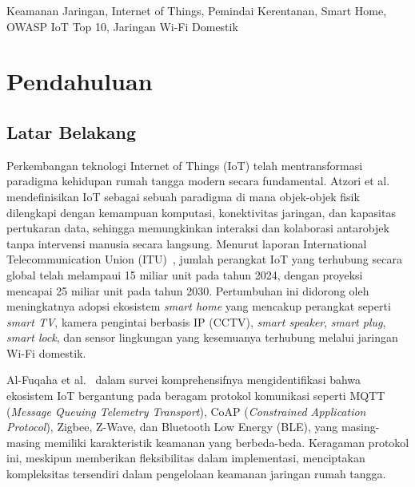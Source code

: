 \documentclass[conference]{IEEEtran}
\begin{document}
\begin{IEEEkeywords}
Keamanan Jaringan, Internet of Things, Pemindai Kerentanan, Smart Home, OWASP IoT Top 10, Jaringan Wi-Fi Domestik
\end{IEEEkeywords}

\section{Pendahuluan}

\subsection{Latar Belakang}

Perkembangan teknologi Internet of Things (IoT) telah mentransformasi paradigma kehidupan rumah tangga modern secara fundamental. Atzori et al.\ \cite{atzori2010} mendefinisikan IoT sebagai sebuah paradigma di mana objek-objek fisik dilengkapi dengan kemampuan komputasi, konektivitas jaringan, dan kapasitas pertukaran data, sehingga memungkinkan interaksi dan kolaborasi antarobjek tanpa intervensi manusia secara langsung. Menurut laporan International Telecommunication Union (ITU)\ \cite{itu2024}, jumlah perangkat IoT yang terhubung secara global telah melampaui 15 miliar unit pada tahun 2024, dengan proyeksi mencapai 25 miliar unit pada tahun 2030. Pertumbuhan ini didorong oleh meningkatnya adopsi ekosistem \textit{smart home} yang mencakup perangkat seperti \textit{smart TV}, kamera pengintai berbasis IP (CCTV), \textit{smart speaker}, \textit{smart plug}, \textit{smart lock}, dan sensor lingkungan yang kesemuanya terhubung melalui jaringan Wi-Fi domestik.

Al-Fuqaha et al.\ \cite{alfuqaha2015} dalam survei komprehensifnya mengidentifikasi bahwa ekosistem IoT bergantung pada beragam protokol komunikasi seperti MQTT (\textit{Message Queuing Telemetry Transport}), CoAP (\textit{Constrained Application Protocol}), Zigbee, Z-Wave, dan Bluetooth Low Energy (BLE), yang masing-masing memiliki karakteristik keamanan yang berbeda-beda. Keragaman protokol ini, meskipun memberikan fleksibilitas dalam implementasi, menciptakan kompleksitas tersendiri dalam pengelolaan keamanan jaringan rumah tangga.
\end{document}
